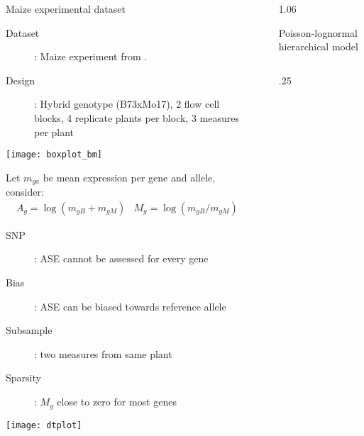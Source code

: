 \documentclass[final]{beamer}
\newlength{\onecolwid}
\newlength{\twocolwid}
\newlength{\threecolwid}
\begin{document}
\begin{frame}
\begin{columns}[t,totalwidth=\threecolwid]
\begin{column}{\onecolwid}
\begin{alertblock}{Maize experimental dataset}
\begin{description}
\item[Dataset]: Maize experiment  from \cite{Paschold2012}. 
\item[Design]:  Hybrid genotype (B73xMo17), 2 flow cell blocks, 4 replicate plants per block, 3 measures per plant 
\end{description}

\begin{center}
\texttt{[image: boxplot\_bm]}
\end{center}

Let $m_{ga}$ be mean expression per gene and allele, consider: 
\[
\begin{array}{cc}
A_g=\log(m_{gB}+m_{gM}) & M_g = \log(m_{gB}/m_{gM})
\end{array}
\]

\vspace{1cm}

 \begin{description}
   \item[SNP]: ASE cannot be assessed for every gene
   \item[Bias]: ASE can be biased towards reference allele
   \item[Subsample]: two measures from same plant
   \item[Sparsity]: $M_g$ close to zero for most genes
 \end{description}

\begin{center}
\texttt{[image: dtplot]}
\end{center}


\end{alertblock}

\end{column}  %

\begin{column}{1cm}\end{column}  %

\begin{column}{1.06\twocolwid}    
      \begin{alertblock}{Poisson-lognormal hierarchical model}
\begin{columns}[t, totalwidth = \twocolwid] 

\begin{column}{.25\twocolwid}


\end{column}
\end{columns}
\end{alertblock}
\end{column}
\end{columns}
\end{frame}
\end{document}
